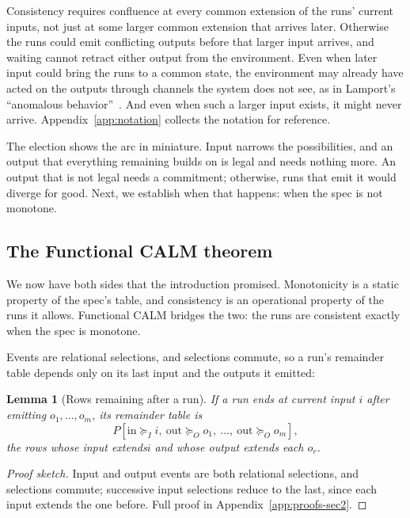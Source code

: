\documentclass[sigconf]{cidr-2027}
\newtheorem{lemma}{Lemma}
\theoremstyle{remark}
\newcommand{\InputGe}{\succeq_I}
\newcommand{\OutputGe}{\succeq_O}
\newcommand{\commitment}{commitment\xspace}
\newcommand{\inrel}{extends\xspace}          %
\newcommand{\outrel}{extends\xspace}          %
\begin{document}
Consistency requires confluence at every common extension of the runs' current
inputs, not just at some larger common extension that arrives later. Otherwise
the runs could emit conflicting outputs before that larger input arrives, and
waiting cannot retract either output from the environment. Even when later
input could bring the runs to a common state, the environment may already have
acted on the outputs through channels the system does not see, as in Lamport's
``anomalous behavior''~\cite{lamport1978time}. And even when such a larger
input exists, it might never arrive. Appendix~\ref{app:notation} collects the
notation for reference.

\textcolor{reviewed}{The election shows the arc in miniature.} \textcolor{reviewed}{Input narrows the possibilities, and
an output that everything remaining builds on is legal and needs nothing more.} \textcolor{reviewed}{An output that is not legal needs a \commitment; otherwise, runs that emit it
would diverge for good.} \textcolor{reviewed}{Next, we establish when that happens: when the spec is
not monotone.}

\subsection{The Functional CALM theorem}
\label{sec:functional-calm-theorem}

We now have both sides that the introduction promised. \textcolor{reviewed}{Monotonicity is a
static property of the spec's table, and consistency is an operational property
of the runs it allows.} \textcolor{reviewed}{Functional CALM bridges the two: the runs are
consistent exactly when the spec is monotone.}

\textcolor{reviewed}{Events are relational
selections, and selections commute, so a run's remainder table depends only on
its last input and the outputs it emitted:}

\begin{lemma}[Rows remaining after a run]
\label{lem:run-residual}
If a run ends at current input $i$ after emitting
$o_1,\ldots,o_m$, its remainder table is
\begin{equation}
  P[\mathrm{in}\InputGe i,\ \mathrm{out}\OutputGe o_1,\ \ldots,\
    \mathrm{out}\OutputGe o_m],
  \label{eq:run-residual}
\end{equation}
\textcolor{reviewed}{the rows whose input \inrel $i$ and whose output \outrel each $o_r$.}
\end{lemma}

\begin{proof}[Proof sketch]
Input and output events are both relational selections, and selections
commute; successive input selections reduce to the last, since each input
extends the one before. Full proof in Appendix~\ref{app:proofs-sec2}.
\end{proof}
\end{document}
